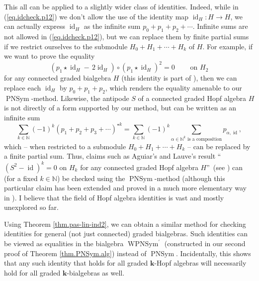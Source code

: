 \documentclass[numbers=enddot,12pt,final,onecolumn,notitlepage]{scrartcl}%
\theoremstyle{definition}
\let\sumnonlimits\sum
\renewcommand{\sum}{\sumnonlimits\limits}
\begin{document}
This all can be applied to a slightly wider class of identities. Indeed, while
in (\ref{eq.idcheck.p12}) we don't allow the use of the identity map
$\operatorname*{id}\nolimits_{H}:H\rightarrow H$, we can actually express
$\operatorname*{id}\nolimits_{H}$ as the infinite sum $p_{0}+p_{1}%
+p_{2}+\cdots$. Infinite sums are not allowed in (\ref{eq.idcheck.p12}), but
we can replace them by finite partial sums if we restrict ourselves to the
submodule $H_{0}+H_{1}+\cdots+H_{k}$ of $H$. For example, if we want to prove
the equality%
\[
\left(  p_{1}\star\operatorname*{id}\nolimits_{H}-\,2\operatorname*{id}%
\nolimits_{H}\right)  \circ\left(  p_{1}\star\operatorname*{id}\nolimits_{H}%
\right)  ^{2}=0\ \ \ \ \ \ \ \ \ \ \text{on }H_{2}%
\]
for any connected graded bialgebra $H$ (this identity is part of \cite[Theorem
1.4 \textbf{(b)}]{aphae}), then we can replace each $\operatorname*{id}%
\nolimits_{H}$ by $p_{0}+p_{1}+p_{2}$, which renders the equality amenable to
our $\operatorname*{PNSym}$-method. Likewise, the antipode $S$ of a connected
graded Hopf algebra $H$ is not directly of a form supported by our method, but
can be written as an infinite sum%
\[
\sum_{k\in\mathbb{N}}\left(  -1\right)  ^{k}\left(  p_{1}+p_{2}+p_{3}%
+\cdots\right)  ^{\star k}=\sum_{k\in\mathbb{N}}\left(  -1\right)  ^{k}%
\sum_{\alpha\in\mathbb{N}^{k}\text{ is a composition}}p_{\alpha
,\operatorname*{id}},
\]
which -- when restricted to a submodule $H_{0}+H_{1}+\cdots+H_{k}$ -- can be
replaced by a finite partial sum. Thus, claims such as Aguiar's and Lauve's
result \textquotedblleft$\left(  S^{2}-\operatorname*{id}\right)  ^{k}=0$ on
$H_{k}$ for any connected graded Hopf algebra $H$\textquotedblright\ (see
\cite[Proposition 7]{AguLau14}) can (for a fixed $k\in\mathbb{N}$) be checked
using the $\operatorname*{PNSym}$-method (although this particular claim has
been extended and proved in a much more elementary way in
\cite{antipode-squared}). I believe that the field of Hopf algebra identities
is vast and mostly unexplored so far. \medskip

Using Theorem \ref{thm.pas-lin-ind2}, we can obtain a similar method for
checking identities for general (not just connected) graded bialgebras. Such
identities can be viewed as equalities in the bialgebra
$\operatorname*{WPNSym}\nolimits^{\prime}$ (constructed in our second proof of
Theorem \ref{thm.PNSym.alg}) instead of $\operatorname*{PNSym}$. Incidentally,
this shows that any such identity that holds for all graded $\mathbf{k}$-Hopf
algebras will necessarily hold for all graded $\mathbf{k}$-bialgebras as well.
\end{document}
